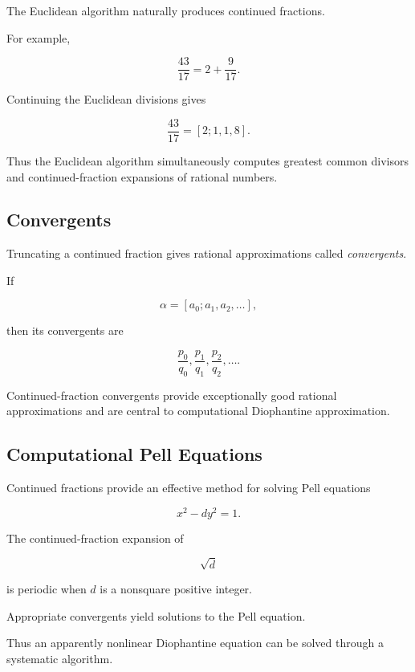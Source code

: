 The Euclidean algorithm naturally produces continued fractions.

For example,

\[ \frac{43}{17}=2+\frac9{17}. \]

Continuing the Euclidean divisions gives

\[ \frac{43}{17}=[2;1,1,8]. \]

Thus the Euclidean algorithm simultaneously computes greatest common divisors
and continued-fraction expansions of rational numbers.

\subsection{Convergents}
\label{subsec:continued-fraction-convergents}

Truncating a continued fraction gives rational approximations called
\emph{convergents}.

If

\[ \alpha=[a_0;a_1,a_2,\ldots], \]

then its convergents are

\[
\frac{p_0}{q_0},
\frac{p_1}{q_1},
\frac{p_2}{q_2},
\ldots.
\]

Continued-fraction convergents provide exceptionally good rational
approximations and are central to computational Diophantine approximation.

\subsection{Computational Pell Equations}
\label{subsec:computational-pell-equations}

Continued fractions provide an effective method for solving Pell equations

\[ x^2-dy^2=1. \]

The continued-fraction expansion of

\[ \sqrt d \]

is periodic when \(d\) is a nonsquare positive integer.

Appropriate convergents yield solutions to the Pell equation.

Thus an apparently nonlinear Diophantine equation can be solved through a
systematic algorithm.

